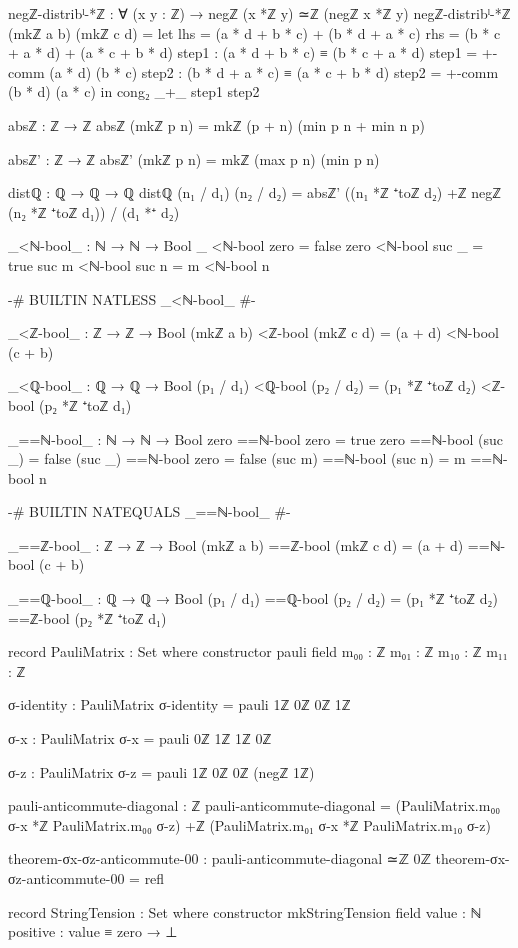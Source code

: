 \documentclass[11pt,a4paper]{book}
\begin{document}
\begin{code}
negℤ-distribˡ-*ℤ : ∀ (x y : ℤ) → negℤ (x *ℤ y) ≃ℤ (negℤ x *ℤ y)
negℤ-distribˡ-*ℤ (mkℤ a b) (mkℤ c d) = 
  let lhs = (a * d + b * c) + (b * d + a * c)
      rhs = (b * c + a * d) + (a * c + b * d)
      step1 : (a * d + b * c) ≡ (b * c + a * d)
      step1 = +-comm (a * d) (b * c)
      step2 : (b * d + a * c) ≡ (a * c + b * d)
      step2 = +-comm (b * d) (a * c)
  in cong₂ _+_ step1 step2

absℤ : ℤ → ℤ
absℤ (mkℤ p n) = mkℤ (p + n) (min p n + min n p)

absℤ' : ℤ → ℤ
absℤ' (mkℤ p n) = mkℤ (max p n) (min p n)

distℚ : ℚ → ℚ → ℚ
distℚ (n₁ / d₁) (n₂ / d₂) = absℤ' ((n₁ *ℤ ⁺toℤ d₂) +ℤ negℤ (n₂ *ℤ ⁺toℤ d₁)) / (d₁ *⁺ d₂)

_<ℕ-bool_ : ℕ → ℕ → Bool
_ <ℕ-bool zero = false
zero <ℕ-bool suc _ = true
suc m <ℕ-bool suc n = m <ℕ-bool n

{-# BUILTIN NATLESS _<ℕ-bool_ #-}

_<ℤ-bool_ : ℤ → ℤ → Bool
(mkℤ a b) <ℤ-bool (mkℤ c d) = (a + d) <ℕ-bool (c + b)

_<ℚ-bool_ : ℚ → ℚ → Bool
(p₁ / d₁) <ℚ-bool (p₂ / d₂) = 
  (p₁ *ℤ ⁺toℤ d₂) <ℤ-bool (p₂ *ℤ ⁺toℤ d₁)

_==ℕ-bool_ : ℕ → ℕ → Bool
zero ==ℕ-bool zero = true
zero ==ℕ-bool (suc _) = false
(suc _) ==ℕ-bool zero = false
(suc m) ==ℕ-bool (suc n) = m ==ℕ-bool n

{-# BUILTIN NATEQUALS _==ℕ-bool_ #-}

_==ℤ-bool_ : ℤ → ℤ → Bool
(mkℤ a b) ==ℤ-bool (mkℤ c d) = (a + d) ==ℕ-bool (c + b)

_==ℚ-bool_ : ℚ → ℚ → Bool
(p₁ / d₁) ==ℚ-bool (p₂ / d₂) = 
  (p₁ *ℤ ⁺toℤ d₂) ==ℤ-bool (p₂ *ℤ ⁺toℤ d₁)

record PauliMatrix : Set where
  constructor pauli
  field
    m₀₀ : ℤ
    m₀₁ : ℤ
    m₁₀ : ℤ
    m₁₁ : ℤ

σ-identity : PauliMatrix
σ-identity = pauli 1ℤ 0ℤ 0ℤ 1ℤ

σ-x : PauliMatrix
σ-x = pauli 0ℤ 1ℤ 1ℤ 0ℤ

σ-z : PauliMatrix
σ-z = pauli 1ℤ 0ℤ 0ℤ (negℤ 1ℤ)

pauli-anticommute-diagonal : ℤ
pauli-anticommute-diagonal = 
  (PauliMatrix.m₀₀ σ-x *ℤ PauliMatrix.m₀₀ σ-z) +ℤ 
  (PauliMatrix.m₀₁ σ-x *ℤ PauliMatrix.m₁₀ σ-z)

theorem-σx-σz-anticommute-00 : pauli-anticommute-diagonal ≃ℤ 0ℤ
theorem-σx-σz-anticommute-00 = refl

record StringTension : Set where
  constructor mkStringTension
  field
    value    : ℕ
    positive : value ≡ zero → ⊥


\end{code}
\end{document}
